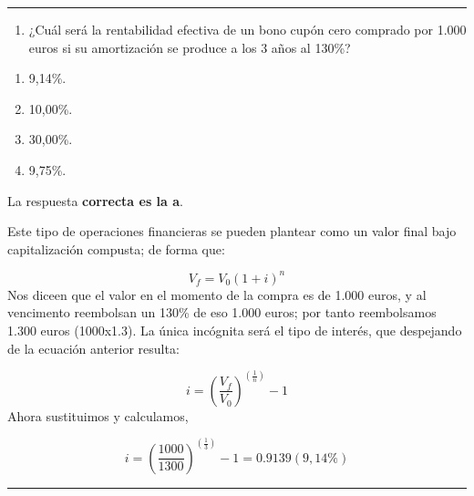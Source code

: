 \documentclass[
  letterpaper,
  DIV=11,
  numbers=noendperiod]{scrreprt}
\providecommand{\tightlist}{%
  \setlength{\itemsep}{0pt}\setlength{\parskip}{0pt}}\usepackage{longtable,booktabs,array}
\begin{document}
\begin{center}\rule{0.5\linewidth}{0.5pt}\end{center}

\begin{enumerate}
\def\labelenumi{\arabic{enumi}.}
\setcounter{enumi}{69}
\tightlist
\item
  ¿Cuál será la rentabilidad efectiva de un bono cupón cero comprado por
  1.000 euros si su amortización se produce a los 3 años al 130\%?
\end{enumerate}

\begin{enumerate}
\def\labelenumi{\alph{enumi})}
\item
  9,14\%.
\item
  10,00\%.
\item
  30,00\%.
\item
  9,75\%.
\end{enumerate}

\begin{tcolorbox}[enhanced jigsaw, left=2mm, opacityback=0, colback=white, breakable, arc=.35mm, bottomrule=.15mm, rightrule=.15mm, toprule=.15mm, leftrule=.75mm, colframe=quarto-callout-tip-color-frame]
\begin{minipage}[t]{5.5mm}
\textcolor{quarto-callout-tip-color}{\faLightbulb}
\end{minipage}%
\begin{minipage}[t]{\textwidth - 5.5mm}

La respuesta \textbf{correcta es la a}.

Este tipo de operaciones financieras se pueden plantear como un valor
final bajo capitalización compusta; de forma que:

\[V_f=V_0\left(1+i\right)^n\] Nos diceen que el valor en el momento de
la compra es de 1.000 euros, y al vencimento reembolsan un 130\% de eso
1.000 euros; por tanto reembolsamos 1.300 euros (1000x1.3). La única
incógnita será el tipo de interés, que despejando de la ecuación
anterior resulta:

\[i=\left(\frac{V_f}{V_0}\right)^{\left(\frac{1}{n}\right)}-1\] Ahora
sustituimos y calculamos,

\[i=\left(\frac{1000}{1300}\right)^{\left(\frac{1}{3}\right)}-1=0.9139(9,14\%)\]

\end{minipage}%
\end{tcolorbox}

\begin{center}\rule{0.5\linewidth}{0.5pt}\end{center}
\end{document}
